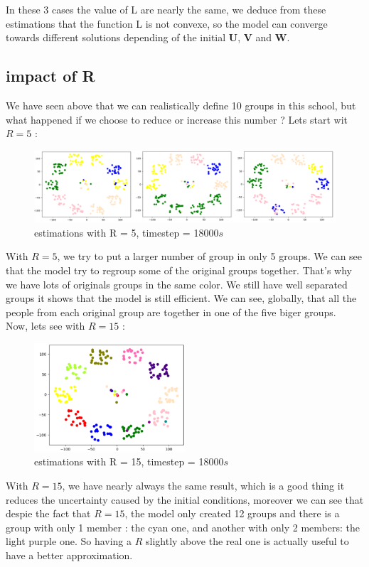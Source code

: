 \documentclass{article}
\begin{document}
In these 3 cases the value of L are nearly the same, we deduce from these estimations that the function L is not convexe, so the model can converge 
towards different solutions depending of the initial $\mathbf{U}$, $\mathbf{V}$ and $\mathbf{W}$.

\subsection{impact of R}

We have seen above that we can realistically define 10 groups in this school, but what happened if we choose to reduce or increase this number ?
Lets start wit $R = 5$ :\\

\begin{figure}[H]
    \centering
    \includegraphics[width=1\textwidth]{images/R=5_t=18000.png}
    \caption{estimations with R = 5, timestep = 18000$s$}
\end{figure}

With $R = 5$, we try to put a larger number of group in only 5 groups. We can see that the model try to regroup some of the original groups
together. That's why we have lots of originals groups in the same color. We still have well separated groups it shows that
the model is still efficient. We can see, globally, that all the people from each original group are together in one of the five biger groups.\\

Now, lets see with $R = 15$ :

\begin{figure}[H]
    \centering
    \includegraphics[width=0.5\textwidth]{images/R=15_t=18000.png}
    \caption{estimations with R = 15, timestep = 18000$s$}
\end{figure}

With $R = 15$, we have nearly always the same result, which is a good thing it reduces the uncertainty caused by the initial conditions,
moreover we can see that despie the fact that $R = 15$, the model only created 12 groups and there is a group with only 1 member : the cyan one, and another with only
2 members: the light purple one. So having a $R$ slightly above the real one is actually useful to have a better approximation.


    
\end{document}
